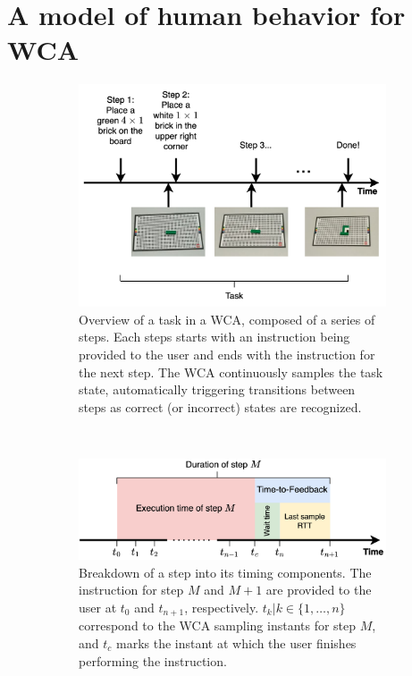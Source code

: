 \section{A model of human behavior for \ac{WCA}}\label{sec:model}


\begin{figure}
    \centering
    \begin{subfigure}{\columnwidth}
        \centering
        \includegraphics[width=\columnwidth]{figs/task.png}
        \caption{%
            Overview of a task in a \ac{WCA}, composed of a series of steps.
            Each steps starts with an instruction being provided to the user and ends with the instruction for the next step.
            The \ac{WCA} continuously samples the task state, automatically triggering transitions between steps as correct (or incorrect) states are recognized.
        }\label{fig:task}
    \end{subfigure}\\
    \begin{subfigure}{\columnwidth}
        \centering
        \includegraphics[width=\columnwidth]{figs/step_time.png}
        \caption{%
            Breakdown of a step into its timing components.
            The instruction for step \( M \) and \( M + 1 \) are provided to the user at \( t_0 \) and \( t_{n+1} \), respectively.
            \( t_k | k \in \{1, \ldots, n \} \) correspond to the \ac{WCA} sampling instants for step \( M \), and \( t_c \) marks the instant at which the user finishes performing the instruction.
        }\label{fig:step}
    \end{subfigure}
    \caption{}
\end{figure}

